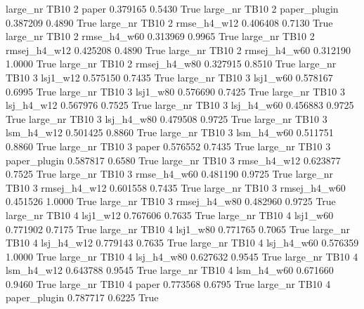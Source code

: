   large_nr     TB10                 2        paper    0.379165      0.5430    True
  large_nr     TB10                 2 paper_plugin    0.387209      0.4890    True
  large_nr     TB10                 2  rmse_h4_w12    0.406408      0.7130    True
  large_nr     TB10                 2  rmse_h4_w60    0.313969      0.9965    True
  large_nr     TB10                 2 rmsej_h4_w12    0.425208      0.4890    True
  large_nr     TB10                 2 rmsej_h4_w60    0.312190      1.0000    True
  large_nr     TB10                 2 rmsej_h4_w80    0.327915      0.8510    True
  large_nr     TB10                 3     lsj1_w12    0.575150      0.7435    True
  large_nr     TB10                 3     lsj1_w60    0.578167      0.6995    True
  large_nr     TB10                 3     lsj1_w80    0.576690      0.7425    True
  large_nr     TB10                 3   lsj_h4_w12    0.567976      0.7525    True
  large_nr     TB10                 3   lsj_h4_w60    0.456883      0.9725    True
  large_nr     TB10                 3   lsj_h4_w80    0.479508      0.9725    True
  large_nr     TB10                 3   lsm_h4_w12    0.501425      0.8860    True
  large_nr     TB10                 3   lsm_h4_w60    0.511751      0.8860    True
  large_nr     TB10                 3        paper    0.576552      0.7435    True
  large_nr     TB10                 3 paper_plugin    0.587817      0.6580    True
  large_nr     TB10                 3  rmse_h4_w12    0.623877      0.7525    True
  large_nr     TB10                 3  rmse_h4_w60    0.481190      0.9725    True
  large_nr     TB10                 3 rmsej_h4_w12    0.601558      0.7435    True
  large_nr     TB10                 3 rmsej_h4_w60    0.451526      1.0000    True
  large_nr     TB10                 3 rmsej_h4_w80    0.482960      0.9725    True
  large_nr     TB10                 4     lsj1_w12    0.767606      0.7635    True
  large_nr     TB10                 4     lsj1_w60    0.771902      0.7175    True
  large_nr     TB10                 4     lsj1_w80    0.771765      0.7065    True
  large_nr     TB10                 4   lsj_h4_w12    0.779143      0.7635    True
  large_nr     TB10                 4   lsj_h4_w60    0.576359      1.0000    True
  large_nr     TB10                 4   lsj_h4_w80    0.627632      0.9545    True
  large_nr     TB10                 4   lsm_h4_w12    0.643788      0.9545    True
  large_nr     TB10                 4   lsm_h4_w60    0.671660      0.9460    True
  large_nr     TB10                 4        paper    0.773568      0.6795    True
  large_nr     TB10                 4 paper_plugin    0.787717      0.6225    True

